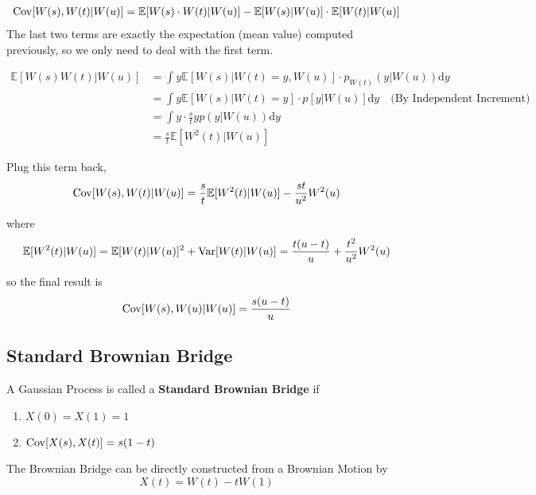         \begin{align*}
            \mathrm{Cov}[W(s), W(t) | W(u)] &= \mathbb{E}[W(s) \cdot W(t) | W(u)] - \mathbb{E}[W(s) | W(u)] \cdot \mathbb{E}[W(t) | W(u)]\\
        \end{align*}
        The last two terms are exactly the expectation (mean value) computed previously, so we only need to deal with the first term.

        \begin{align*}
            \mathbb{E}[W(s)W(t)|W(u)] &= \int y \mathbb{E}[W(s)|W(t)=y, W(u)]\cdot p_{W(t)}(y|W(u)) \mathrm{d}y\\
            &= \int y \mathbb{E}[W(s) | W(t) = y] \cdot p[y|W(u)]\mathrm{d}y \quad \text{(By Independent Increment)}\\
            &= \int y \cdot \frac{s}{t}y p(y|W(u))\mathrm{d}y\\
            &= \frac{s}{t}\mathbb{E}[W^2(t)|W(u)]
        \end{align*}
        
        Plug this term back,
        \[
            \mathrm{Cov}[W(s), W(t) | W(u)] = \frac{s}{t}\mathbb{E}[W^2(t)|W(u)] - \frac{st}{u^2}W^2(u)
        \]

        where
        \[ \mathbb{E}[W^2(t)|W(u)] = \mathbb{E}[W(t)|W(u)]^2 + \mathrm{Var}[W(t)|W(u)] = \frac{t(u-t)}{u} + \frac{t^2}{u^2}W^2(u) \]

        so the final result is
        \[ \mathrm{Cov}[W(s), W(u) | W(u)] = \frac{s(u-t)}{u} \]

    \subsection{Standard Brownian Bridge}
        \begin{definition}\label{Def:BrownianBridgeStd}
            A Gaussian Process is called a \textbf{Standard Brownian Bridge} if
            \begin{enumerate}
                \item $X(0) = X(1) = 1$
                \item $\mathrm{Cov}[X(s), X(t)] = s(1-t)$
            \end{enumerate}
        \end{definition}
        \begin{remark}
            The Brownian Bridge can be directly constructed from a Brownian Motion by
            \[ X(t) = W(t) - tW(1) \]
        \end{remark}

